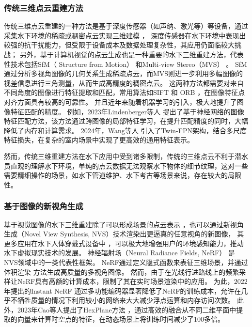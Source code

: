 \subsubsection{传统三维点云重建方法}
传统三维点云重建的一种方法是基于深度传感器（如声纳、激光等）等设备，通过采集水下环境的稀疏或稠密点云实现三维建模 \cite{sonar1}\cite{sonar2}，
深度传感器在水下环境中表现出较强的抗干扰能力，但受限于设备成本及数据处理复杂性，其应用仍面临较大挑战；
另外，基于计算机视觉的点云生成也是一种重要的水下三维重建方法，代表性技术包括SfM（ Structure from Motion）\cite{sfm1, sfm2} 和Multi-view Stereo（MVS） \cite{mvs}。
SfM通过分析多视角图像的几何关系生成稀疏点云，而MVS则进一步利用多幅图像的视差信息进行三角测量，从而生成高精度的稠密点云。
这两种方法都需要对来自不同角度的图像进行特征提取和匹配，常用算法如SIFT \cite{sift} 和 ORB \cite{orb}，在图像特征点对齐方面具有较高的可靠性。
并且近年来随着机器学习的引入，极大地提升了图像特征匹配的精度。
例如，2023年Lindenberger等人 \cite{lightglue} 提出了基于神经网络的图像特征匹配方法，该方法通过跨图像的局部特征学习，在提升匹配精度的同时，大幅降低了内存和计算需求。
2024年，Wang等人 \cite{enhancing-mvs} 引入了Twin-FPN架构，结合多尺度特征损失，在复杂的室内场景中实现了更高效的通用特征表示。

然而，传统三维重建方法在水下应用中受到诸多限制，传统的三维点云不利于潜水员直观的理解水下环境，单纯的点云数据无法观察水下物体的细节纹理，这对一些需要精细操作的场景，如水下管道维护、水下考古等场景来说，存在较大的局限性。


\subsubsection{基于图像的新视角生成}
基于视觉图像的水下三维重建除了可以形成场景的点云表示\cite{vision_recon} ，也可以通过新视角生成（Novel View Synthesis, NVS）技术渲染出更逼真的任意视角的新图像，
其更多应用在水下人体穿戴式设备中 \cite{Xia2023}\cite{underwater_perception}，可以极大地增强用户的环境感知能力，推动水下虚拟现实技术的发展。
神经辐射场（Neural Radiance Fields, NeRF） \cite{nerf}\cite{Mip_nerf360} 是NVS领域中的一类代表性框架。
NeRF通过定义隐式函数来表征三维场景，并通过体积渲染 \cite{volume_render} 方法生成高质量的多视角图像。
然而，由于在光线行进路线上的频繁采样让NeRF具有高额的计算成本，限制了其在实时场景渲染中的应用。
为此，2022年提出的Instant NeRF \cite{instant_nerf} 通过多功能编码器显著降低了NeRF的训练成本，允许在几乎不牺牲质量的情况下利用较小的网络来大大减少浮点运算和内存访问次数。
此外，2023年Cao等人提出了HexPlane方法 \cite{hex_plane}，通过高效的融合从不同二维平面中提取的向量来计算时空点的特征，在动态场景上将训练时间减少了100多倍。

